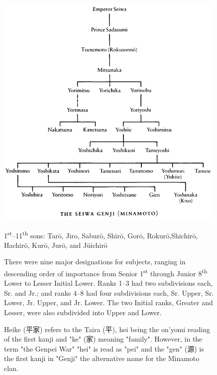 \documentclass{article}
\begin{document}
\begin{figure}
    \begin{minipage}{0.6\textwidth}
        \hspace*{-1.75cm}
        \includegraphics[height=4.5in]{heike-tree-minamoto.png}
    \end{minipage}
    \begin{minipage}{0.4\textwidth}
        1\textsuperscript{st}--11\textsuperscript{th} sons: Tarō, Jiro, Saburō, Shirō, Gorō, Rokurō,Shichirō, Hachirō, Kurō, Jurō, and Jūichirō

        \vspace{1em}

        There were nine major designations for subjects,
        ranging in descending order of importance from
        Senior 1\textsuperscript{st} through
        Junior 8\textsuperscript{th} Lower
        to Lesser Initial Lower.
        Ranks 1--3 had two subdivisions each, Sr. and Jr.;
        and ranks 4--8 had four subdivisions each, Sr. Upper, Sr. Lower, Jr.
        Upper, and Jr. Lower.
        The two Initial ranks, Greater and Lesser, were also subdivided into Upper and Lower.

        \vspace{1em}

        Heike (平家) refers to the Taira (平), hei being the on'yomi reading of the first kanji and "ke" (家) meaning "family". However, in the term "the Genpei War" "hei" is read as "pei" and the "gen" (源) is the first kanji in "Genji" the alternative name for the Minamoto clan.

    \end{minipage}
\end{figure}
\end{document}
